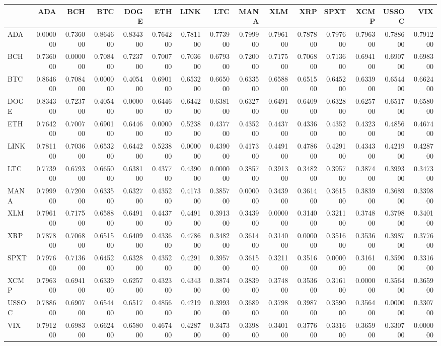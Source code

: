 \begin{tabular}{lrrrrrrrrrrrrrr}
\toprule
 & ADA & BCH & BTC & DOGE & ETH & LINK & LTC & MANA & XLM & XRP & SPXT & XCMP & USSOC & VIX \\
\midrule
ADA & 0.000000 & 0.736000 & 0.864600 & 0.834300 & 0.764200 & 0.781100 & 0.773900 & 0.799900 & 0.796100 & 0.787800 & 0.797600 & 0.796300 & 0.788600 & 0.791200 \\
BCH & 0.736000 & 0.000000 & 0.708400 & 0.723700 & 0.700700 & 0.703600 & 0.679300 & 0.720000 & 0.717500 & 0.706800 & 0.713600 & 0.694100 & 0.690700 & 0.698300 \\
BTC & 0.864600 & 0.708400 & 0.000000 & 0.405400 & 0.690100 & 0.653200 & 0.665000 & 0.633500 & 0.658800 & 0.651500 & 0.645200 & 0.633900 & 0.654400 & 0.662400 \\
DOGE & 0.834300 & 0.723700 & 0.405400 & 0.000000 & 0.644600 & 0.644200 & 0.638100 & 0.632700 & 0.649100 & 0.640900 & 0.632800 & 0.625700 & 0.651700 & 0.658000 \\
ETH & 0.764200 & 0.700700 & 0.690100 & 0.644600 & 0.000000 & 0.523800 & 0.437700 & 0.435200 & 0.443700 & 0.433600 & 0.435200 & 0.432300 & 0.485600 & 0.467400 \\
LINK & 0.781100 & 0.703600 & 0.653200 & 0.644200 & 0.523800 & 0.000000 & 0.439000 & 0.417300 & 0.449100 & 0.478600 & 0.429100 & 0.434300 & 0.421900 & 0.428700 \\
LTC & 0.773900 & 0.679300 & 0.665000 & 0.638100 & 0.437700 & 0.439000 & 0.000000 & 0.385700 & 0.391300 & 0.348200 & 0.395700 & 0.387400 & 0.399300 & 0.347300 \\
MANA & 0.799900 & 0.720000 & 0.633500 & 0.632700 & 0.435200 & 0.417300 & 0.385700 & 0.000000 & 0.343900 & 0.361400 & 0.361500 & 0.383900 & 0.368900 & 0.339800 \\
XLM & 0.796100 & 0.717500 & 0.658800 & 0.649100 & 0.443700 & 0.449100 & 0.391300 & 0.343900 & 0.000000 & 0.314000 & 0.321100 & 0.374800 & 0.379800 & 0.340100 \\
XRP & 0.787800 & 0.706800 & 0.651500 & 0.640900 & 0.433600 & 0.478600 & 0.348200 & 0.361400 & 0.314000 & 0.000000 & 0.351600 & 0.353600 & 0.398700 & 0.377600 \\
SPXT & 0.797600 & 0.713600 & 0.645200 & 0.632800 & 0.435200 & 0.429100 & 0.395700 & 0.361500 & 0.321100 & 0.351600 & 0.000000 & 0.316100 & 0.359000 & 0.331600 \\
XCMP & 0.796300 & 0.694100 & 0.633900 & 0.625700 & 0.432300 & 0.434300 & 0.387400 & 0.383900 & 0.374800 & 0.353600 & 0.316100 & 0.000000 & 0.356400 & 0.365900 \\
USSOC & 0.788600 & 0.690700 & 0.654400 & 0.651700 & 0.485600 & 0.421900 & 0.399300 & 0.368900 & 0.379800 & 0.398700 & 0.359000 & 0.356400 & 0.000000 & 0.330700 \\
VIX & 0.791200 & 0.698300 & 0.662400 & 0.658000 & 0.467400 & 0.428700 & 0.347300 & 0.339800 & 0.340100 & 0.377600 & 0.331600 & 0.365900 & 0.330700 & 0.000000 \\
\bottomrule
\end{tabular}

